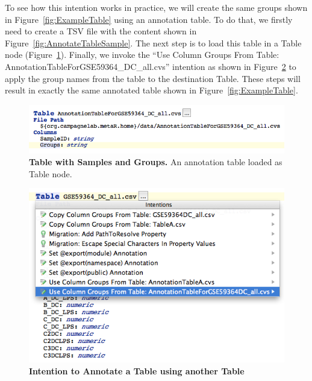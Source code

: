 To see how this intention works in practice, we will create the same groups shown in Figure~\ref{fig:ExampleTable} using an annotation table. To do that, we firstly need to create a TSV file with the content shown in Figure~\ref{fig:AnnotateTableSample}. The next step is to load this table in a Table node (Figure~\ref{fig:NewAnnotationTable}).  Finally, we invoke the ``Use Column Groups From Table: Annotation\allowbreak{}Table\allowbreak{}For\allowbreak{}GSE59364\_DC\_all.cvs'' intention as shown in Figure~\ref{fig:AnnotateTableIntention} to apply the group names from the table to the destination Table. These steps will result in exactly the same annotated table shown in Figure~\ref{fig:ExampleTable}.



 
\begin{figure}[h!tbp]
  \centering
  \includegraphics[width=\figWidthWide]{figures/AnnotationTable.png}
\caption[Table with Samples and Groups]{\textbf{Table with Samples and Groups.} An annotation table loaded as Table node.}
\label{fig:NewAnnotationTable}
\end{figure}


\begin{figure}[h!tbp]
  \centering
  \includegraphics[width=\figWidthWide]{figures/AnnotateTableIntention.png}
\caption[Intention to Annotate a Table using another Table]{\textbf{Intention to Annotate a Table using another Table} }
\label{fig:AnnotateTableIntention}
\end{figure}



